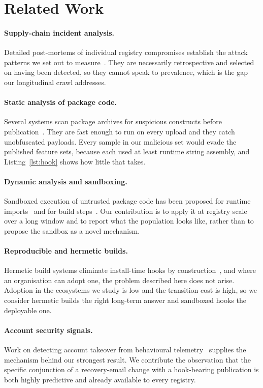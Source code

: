 \section{Related Work}
\label{sec:related}

\paragraph*{Supply-chain incident analysis.}
Detailed post-mortems of individual registry compromises establish the attack
patterns we set out to
measure~\citep{ferrante2021incidents,mbeki2022typosquat}. They are necessarily
retrospective and selected on having been detected, so they cannot speak to
prevalence, which is the gap our longitudinal crawl addresses.

\paragraph*{Static analysis of package code.}
Several systems scan package archives for suspicious constructs before
publication~\citep{ohara2020staticscan}. They are fast enough to run on every
upload and they catch unobfuscated payloads. Every sample in our malicious set
would evade the published feature sets, because each used at least runtime
string assembly, and Listing~\ref{lst:hook} shows how little that takes.

\paragraph*{Dynamic analysis and sandboxing.}
Sandboxed execution of untrusted package code has been proposed for runtime
imports~\citep{vanRhijn2019sandbox} and for build
steps~\citep{szymanska2022buildsandbox}. Our contribution is to apply it at
registry scale over a long window and to report what the population looks like,
rather than to propose the sandbox as a novel mechanism.

\paragraph*{Reproducible and hermetic builds.}
Hermetic build systems eliminate install-time hooks by
construction~\citep{adeyemi2021hermetic}, and where an organisation can adopt
one, the problem described here does not arise. Adoption in the ecosystems we
study is low and the transition cost is high, so we consider hermetic builds
the right long-term answer and sandboxed hooks the deployable one.

\paragraph*{Account security signals.}
Work on detecting account takeover from behavioural
telemetry~\citep{quintero2020takeover} supplies the mechanism behind our
strongest result. We contribute the observation that the specific conjunction
of a recovery-email change with a hook-bearing publication is both highly
predictive and already available to every registry.
